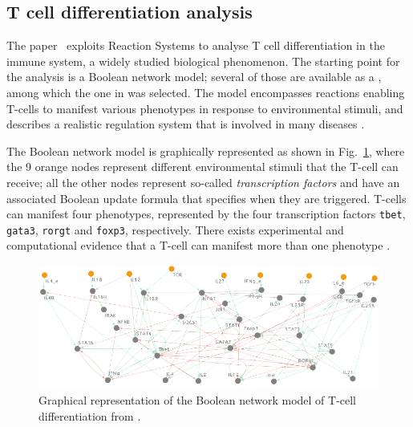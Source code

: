 

\subsection{T cell differentiation analysis}\label{sec:datamod2023}

The paper~\cite{datamod2023} exploits Reaction Systems to analyse T cell differentiation in the immune system, a widely studied biological phenomenon. The starting point for the analysis is a Boolean network model; several of those are available as a \cite{saez2007logical,thakar2010boolean,puniya2018mechanistic}, among which the one in \cite{puniya2018mechanistic} was selected. The model encompasses reactions enabling T-cells to manifest various phenotypes in response to environmental stimuli, and describes a realistic regulation system that is involved in many diseases \cite{lafaille1998role,hirahara2016cd4+,meng2016regulatory}.

The Boolean network model is graphically represented as shown in Fig.~\ref{fig:model-graph}, where the 9 orange nodes represent different environmental stimuli that the T-cell can receive; all the other nodes represent so-called \emph{transcription factors} and have an associated Boolean update formula that specifies when they are triggered. 
T-cells can manifest four phenotypes, 
represented by the four transcription factors \texttt{tbet}, \texttt{gata3}, \texttt{rorgt} and \texttt{foxp3}, respectively.
There exists experimental and computational evidence that a T-cell can manifest more than one phenotype \cite{luckheeram2012cd4+,puniya2018mechanistic}.

\begin{figure}[t]
	\begin{center}
		\includegraphics[width=\columnwidth]{figs-datamod2023/Tcell-graph-8set23.png}
	\end{center}
	\caption{Graphical representation of the Boolean network model of T-cell differentiation from \cite{puniya2018mechanistic}.}
	\label{fig:model-graph}
\end{figure}

